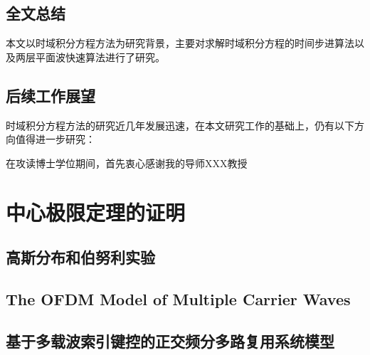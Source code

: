 \documentclass[master]{thesis-uestc}
\begin{document}
\section{全文总结}
本文以时域积分方程方法为研究背景，主要对求解时域积分方程的时间步进算法以及两层平面波快速算法进行了研究。

\section{后续工作展望}
时域积分方程方法的研究近几年发展迅速，在本文研究工作的基础上，仍有以下方向值得进一步研究：

\thesisacknowledgement
在攻读博士学位期间，首先衷心感谢我的导师XXX教授

\thesisappendix

\chapter{中心极限定理的证明}

\section{高斯分布和伯努利实验}


\nocite{*}


%
% 
%
% 
% 
%


\thesistranslationoriginal
\section{The OFDM Model of Multiple Carrier Waves}

\thesistranslationchinese
\section{基于多载波索引键控的正交频分多路复用系统模型}
\end{document}

